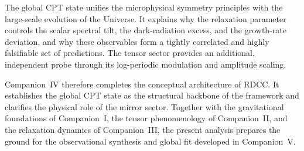 \documentclass[11pt,a4paper]{article}
\begin{document}
The global CPT state unifies the microphysical symmetry principles with the large-scale evolution of the Universe. It explains why the relaxation parameter controls the scalar spectral tilt, the dark-radiation excess, and the growth-rate deviation, and why these observables form a tightly correlated and highly falsifiable set of predictions. The tensor sector provides an additional, independent probe through its log-periodic modulation and amplitude scaling.

Companion~IV therefore completes the conceptual architecture of RDCC. It establishes the global CPT state as the structural backbone of the framework and clarifies the physical role of the mirror sector. Together with the gravitational foundations of Companion~I, the tensor phenomenology of Companion~II, and the relaxation dynamics of Companion~III, the present analysis prepares the ground for the observational synthesis and global fit developed in Companion~V.
\end{document}
